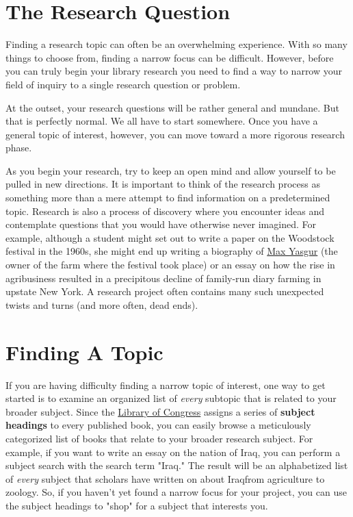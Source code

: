 \documentclass[book]{memoir}
\begin{document}
\section{The Research Question}

Finding a research topic can often be an overwhelming experience. With so many things to choose from, finding a narrow focus can be difficult. However, before you can truly begin your library research you need to find a way to narrow your field of inquiry to a single research question or problem.

At the outset, your research questions will be rather general and mundane. But that is perfectly normal. We all have to start somewhere. Once you have a general topic of interest, however, you can move toward a more rigorous research phase.

As you begin your research, try to keep an open mind and allow yourself to be pulled in new directions. It is important to think of the research process as something more than a mere attempt to find information on a predetermined topic. Research is also a process of discovery where you encounter ideas and contemplate questions that you would have otherwise never imagined. For example, although a student might set out to write a paper on the Woodstock festival in the 1960s, she might end up writing a biography of \href{http://en.wikipedia.org/wikiMax_Yasgur}{Max Yasgur} (the owner of the farm where the festival took place) or an essay on how the rise in agribusiness resulted in a precipitous decline of family-run diary farming in upstate New York. A research project often contains many such unexpected twists and turns (and more often, dead ends).

\section{Finding A Topic}

If you are having difficulty finding a narrow topic of interest, one way to get started is to examine an organized list of \emph{every} subtopic that is related to your broader subject. Since the \href{http://catalog.loc.gov}{Library of Congress} assigns a series of \textbf{subject headings} to every published book, you can easily browse a meticulously categorized list of books that relate to your broader research subject. For example, if you want to write an essay on the nation of Iraq, you can perform a subject search with the search term "Iraq." The result will be an alphabetized list of \emph{every} subject that scholars have written on about Iraq\textemdash from agriculture to zoology. So, if you haven't yet found a narrow focus for your project, you can use the subject headings to "shop" for a subject that interests you. 
\end{document}
